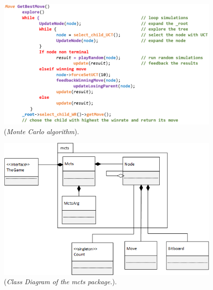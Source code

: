 \begin{figure}[!h] 
\centerline{\includegraphics[scale=0.70]{Base_Algorithm/Img/Algorithm.png}}
\caption{\label{fig:MCTSAlgorithm}(\textit{Monte Carlo algorithm}).}
\end{figure}

\begin{figure}[!h] 
\centerline{\includegraphics[scale=0.8]{Base_Algorithm/Img/MCTSsimple.png}}
\caption{\label{fig:MCTSClassDiagram}(\textit{Class Diagram of the mcts package.}).}
\end{figure}